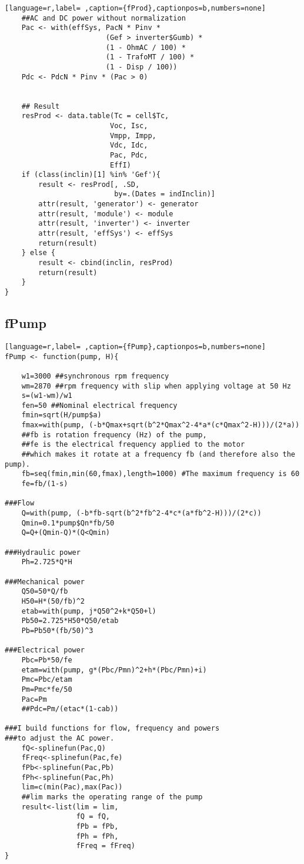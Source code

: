 \begin{lstlisting}[language=r,label= ,caption={fProd},captionpos=b,numbers=none]
    ##AC and DC power without normalization
    Pac <- with(effSys, PacN * Pinv *
                        (Gef > inverter$Gumb) *
                        (1 - OhmAC / 100) *
                        (1 - TrafoMT / 100) *
                        (1 - Disp / 100))
    Pdc <- PdcN * Pinv * (Pac > 0)


    ## Result
    resProd <- data.table(Tc = cell$Tc,
                         Voc, Isc,
                         Vmpp, Impp,
                         Vdc, Idc,
                         Pac, Pdc,
                         EffI)
    if (class(inclin)[1] %in% 'Gef'){
        result <- resProd[, .SD,
                          by=.(Dates = indInclin)]
        attr(result, 'generator') <- generator
        attr(result, 'module') <- module
        attr(result, 'inverter') <- inverter
        attr(result, 'effSys') <- effSys
        return(result)
    } else {
        result <- cbind(inclin, resProd)
        return(result)
    }
}
\end{lstlisting}
\subsection{fPump}
\label{sec:org7417953}
\label{subsec:fpump}
\begin{lstlisting}[language=r,label= ,caption={fPump},captionpos=b,numbers=none]
fPump <- function(pump, H){

    w1=3000 ##synchronous rpm frequency
    wm=2870 ##rpm frequency with slip when applying voltage at 50 Hz
    s=(w1-wm)/w1
    fen=50 ##Nominal electrical frequency
    fmin=sqrt(H/pump$a)
    fmax=with(pump, (-b*Qmax+sqrt(b^2*Qmax^2-4*a*(c*Qmax^2-H)))/(2*a))
    ##fb is rotation frequency (Hz) of the pump,  
    ##fe is the electrical frequency applied to the motor
    ##which makes it rotate at a frequency fb (and therefore also the pump).
    fb=seq(fmin,min(60,fmax),length=1000) #The maximum frequency is 60
    fe=fb/(1-s)

###Flow
    Q=with(pump, (-b*fb-sqrt(b^2*fb^2-4*c*(a*fb^2-H)))/(2*c))
    Qmin=0.1*pump$Qn*fb/50
    Q=Q+(Qmin-Q)*(Q<Qmin)

###Hydraulic power
    Ph=2.725*Q*H

###Mechanical power
    Q50=50*Q/fb
    H50=H*(50/fb)^2
    etab=with(pump, j*Q50^2+k*Q50+l)
    Pb50=2.725*H50*Q50/etab
    Pb=Pb50*(fb/50)^3

###Electrical power
    Pbc=Pb*50/fe
    etam=with(pump, g*(Pbc/Pmn)^2+h*(Pbc/Pmn)+i)
    Pmc=Pbc/etam
    Pm=Pmc*fe/50
    Pac=Pm
    ##Pdc=Pm/(etac*(1-cab))

###I build functions for flow, frequency and powers
###to adjust the AC power.
    fQ<-splinefun(Pac,Q)
    fFreq<-splinefun(Pac,fe)
    fPb<-splinefun(Pac,Pb)
    fPh<-splinefun(Pac,Ph)
    lim=c(min(Pac),max(Pac))
    ##lim marks the operating range of the pump
    result<-list(lim = lim,
                 fQ = fQ,
                 fPb = fPb,
                 fPh = fPh,
                 fFreq = fFreq)
}
\end{lstlisting}
